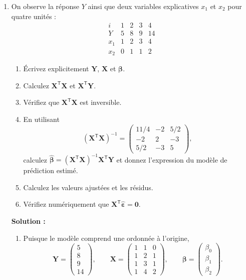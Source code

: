 \documentclass[letter, 11pt]{article}
\newcommand{\bY}{\mathbf{Y}}
\newcommand{\bX}{\mathbf{X}}
\newcommand{\bbeta}{\boldsymbol{\beta}}
\newcommand{\bepsilon}{\boldsymbol{\varepsilon}}
\newcommand{\trans}{^{\mathsf T}}
\newcommand{\prof}[1]{\begin{professeur}\color{blue} {\bf Solution :} #1 \end{professeur}}
\begin{document}
\begin{enumerate}[leftmargin=*, wide, label=\bf Exercice \arabic*:]

\item On observe la réponse $Y$ ainsi que deux variables explicatives $x_1$ et $x_2$
pour quatre unités :
\[
\begin{array}{c|rrrr}
  i   & 1 & 2 & 3 & 4\\ \hline
  Y   & 5 & 8 & 9 & 14\\
  x_1 & 1 & 2 & 3 & 4\\
  x_2 & 0 & 1 & 1 & 2
\end{array}
\]

\begin{enumerate}[label=\alph*)]
  \item Écrivez explicitement $\bY$, $\bX$ et $\bbeta$.
  \item Calculez $\bX\trans\bX$ et $\bX\trans\bY$.
  \item Vérifiez que $\bX\trans\bX$ est inversible.
  \item En utilisant 
        \[
        (\bX\trans\bX)^{-1}=
        \begin{pmatrix}
          11/4&-2&5/2\\
          -2&2&-3\\
          5/2&-3&5
        \end{pmatrix},
        \] calculez $\widehat{\bbeta}=(\bX\trans\bX)^{-1}\bX\trans\bY$ et donnez l'expression du modèle de prédiction estimé.
  \item Calculez les valeurs ajustées et les résidus.
  \item Vérifiez numériquement que $\bX\trans\widehat{\bepsilon}=\mathbf{0}$.
\end{enumerate}

\prof{
\begin{enumerate}[label=\alph*)]
  \item Puisque le modèle comprend une ordonnée à l'origine,
        \[
        \bY=\begin{pmatrix}5\\8\\9\\14\end{pmatrix},\qquad
        \bX=\begin{pmatrix}
          1&1&0\\
          1&2&1\\
          1&3&1\\
          1&4&2
        \end{pmatrix},\qquad
        \bbeta=\begin{pmatrix}\beta_0\\\beta_1\\\beta_2\end{pmatrix}.
        \]


\end{enumerate}}
\end{enumerate}
\end{document}
